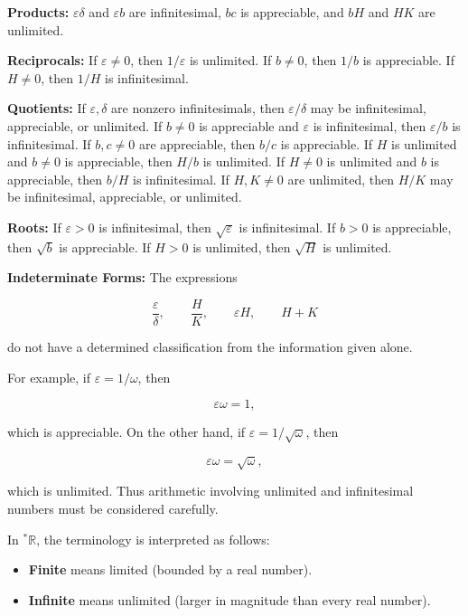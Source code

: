 \documentclass[10pt,a4paper]{book}
\begin{document}
\textbf{Products:} \(\varepsilon\delta\) and \(\varepsilon b\) are infinitesimal, \(bc\) is appreciable, and \(bH\) and \(HK\) are unlimited.

\textbf{Reciprocals:} If \(\varepsilon\neq0\), then \(1/\varepsilon\) is unlimited. If \(b\neq0\), then \(1/b\) is appreciable. If \(H\neq0\), then \(1/H\) is infinitesimal.

\textbf{Quotients:} If \(\varepsilon,\delta\) are nonzero infinitesimals, then \(\varepsilon/\delta\) may be infinitesimal, appreciable, or unlimited. If \(b\neq0\) is appreciable and \(\varepsilon\) is infinitesimal, then \(\varepsilon/b\) is infinitesimal. If \(b,c\neq0\) are appreciable, then \(b/c\) is appreciable. If \(H\) is unlimited and \(b\neq0\) is appreciable, then \(H/b\) is unlimited. If \(H\neq0\) is unlimited and \(b\) is appreciable, then \(b/H\) is infinitesimal. If \(H,K\neq0\) are unlimited, then \(H/K\) may be infinitesimal, appreciable, or unlimited.

\textbf{Roots:} If \(\varepsilon>0\) is infinitesimal, then \(\sqrt{\varepsilon}\) is infinitesimal. If \(b>0\) is appreciable, then \(\sqrt b\) is appreciable. If \(H>0\) is unlimited, then \(\sqrt H\) is unlimited.

\textbf{Indeterminate Forms:} The expressions

$$
    \frac{\varepsilon}{\delta},
    \qquad
    \frac{H}{K},
    \qquad
    \varepsilon H,
    \qquad
    H+K
$$

do not have a determined classification from the information given alone.

For example, if \(\varepsilon=1/\omega\), then

$$
    \varepsilon\omega=1,
$$

which is appreciable. On the other hand, if \(\varepsilon=1/\sqrt{\omega}\),
then

$$
    \varepsilon\omega=\sqrt{\omega},
$$

which is unlimited. Thus arithmetic involving unlimited and infinitesimal
numbers must be considered carefully.

In \({}^\ast\mathbb R\), the terminology is interpreted as follows:

\begin{itemize}

    \item \textbf{Finite} means limited (bounded by a real number).

    \item \textbf{Infinite} means unlimited (larger in magnitude than every real number).

\end{itemize}
\end{document}
